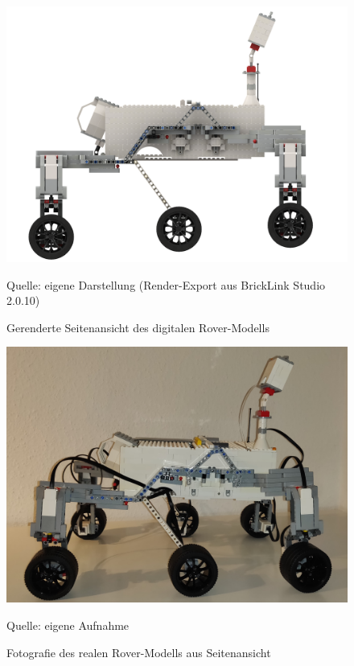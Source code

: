 \begin{figure}
	\centering
	\includegraphics[width=\textwidth]{../Images/20200429_Mars_Rover_V5_side.png}
	\vspace{0.5em}
	\parbox[c]{0.8\linewidth}{\footnotesize
		\centering
		\vspace{1em}
		Quelle: eigene Darstellung (Render-Export aus BrickLink Studio 2.0.10)
	}
	\caption{Gerenderte Seitenansicht des digitalen Rover-Modells}
	\label{fig:roversiderender}
\end{figure}

\begin{figure}
	\centering
	\includegraphics[width=\textwidth]{../Images/20200429_side_01.jpg}
	\vspace{0.5em}
	\parbox[c]{0.8\linewidth}{\footnotesize
		\centering
		\vspace{1em}
		Quelle: eigene Aufnahme
	}
	\caption{Fotografie des realen Rover-Modells aus Seitenansicht}
	\label{fig:roversidefoto}
\end{figure}

